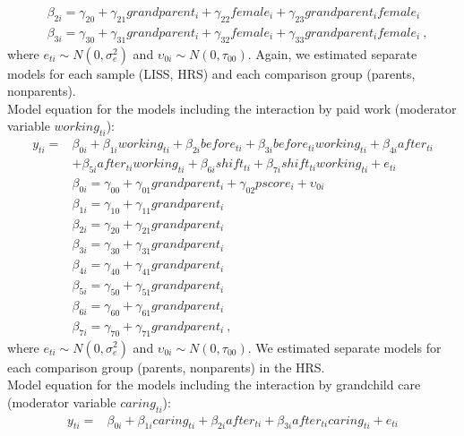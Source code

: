 \documentclass[
  english,
  man, noextraspace]{apa7}
\begin{document}
\begin{appendix}
\begin{equation}
\begin{split}
& \beta_{2i} = \gamma_{20} + \gamma_{21}grandparent_i + \gamma_{22}female_i + \gamma_{23}grandparent_{i}female_{i} \\
& \beta_{3i} = \gamma_{30} + \gamma_{31}grandparent_i + \gamma_{32}female_i + \gamma_{33}grandparent_{i}female_{i}\ ,
\end{split}
\label{eq:mlm2}
\end{equation} where \(e_{ti} \sim N(0, \sigma_e^2)\) and
\(\upsilon_{0i} \sim N(0, \tau_{00})\). Again, we estimated separate
models for each sample (LISS, HRS) and each comparison group (parents,
nonparents).\\
Model equation for the models including the interaction by paid work
(moderator variable \(working_{ti}\)): \begin{equation}
\begin{split}
y_{ti} =& \beta_{0i} + \beta_{1i}working_{ti} + \beta_{2i}before_{ti} + \beta_{3i}before_{ti}working_{ti} + \beta_{4i}after_{ti} \\
& + \beta_{5i}after_{ti}working_{ti} + \beta_{6i}shift_{ti} + \beta_{7i}shift_{ti}working_{ti} + e_{ti} \\
& \beta_{0i} = \gamma_{00} + \gamma_{01}grandparent_i + \gamma_{02}pscore_i + \upsilon_{0i} \\
& \beta_{1i} = \gamma_{10} + \gamma_{11}grandparent_i \\
& \beta_{2i} = \gamma_{20} + \gamma_{21}grandparent_i \\
& \beta_{3i} = \gamma_{30} + \gamma_{31}grandparent_i \\
& \beta_{4i} = \gamma_{40} + \gamma_{41}grandparent_i \\
& \beta_{5i} = \gamma_{50} + \gamma_{51}grandparent_i \\
& \beta_{6i} = \gamma_{60} + \gamma_{61}grandparent_i \\
& \beta_{7i} = \gamma_{70} + \gamma_{71}grandparent_i\ ,
\end{split}
\label{eq:mlm3}
\end{equation} where \(e_{ti} \sim N(0, \sigma_e^2)\) and
\(\upsilon_{0i} \sim N(0, \tau_{00})\). We estimated separate models for
each comparison group (parents, nonparents) in the HRS.\\
Model equation for the models including the interaction by grandchild
care (moderator variable \(caring_{ti}\)): \begin{equation}
\begin{split}
y_{ti} =& \beta_{0i} + \beta_{1i}caring_{ti} + \beta_{2i}after_{ti} + \beta_{3i}after_{ti}caring_{ti} + e_{ti} \\

\end{split}
\end{equation}
\end{appendix}
\end{document}
